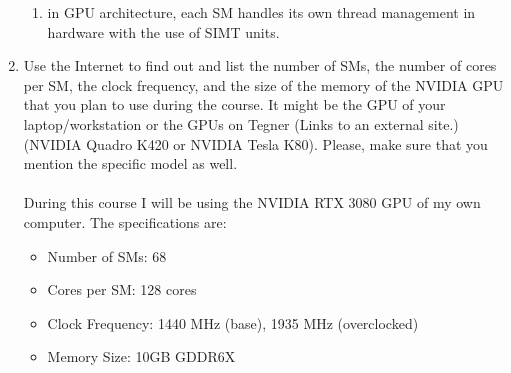 \documentclass[english]{exam}
\begin{document}
\begin{enumerate}
\begin{enumerate}
  \item in GPU architecture, each SM handles its own thread management in hardware with the use of SIMT units.
  \end{enumerate}
\item Use the Internet to find out and list the number of SMs, the number of cores per SM, the clock frequency, and the size of the memory of the NVIDIA GPU that you plan to use during the course. It might be the GPU of your laptop/workstation or the GPUs on Tegner (Links to an external site.) (NVIDIA Quadro K420 or NVIDIA Tesla K80). Please, make sure that you mention the specific model as well.\\\\
  During this course I will be using the NVIDIA RTX 3080 GPU of my own computer. The specifications are:
  \begin{itemize}
  \item Number of SMs: 68
  \item Cores per SM: 128 cores
  \item Clock Frequency: 1440 MHz (base), 1935 MHz (overclocked)
  \item Memory Size: 10GB GDDR6X
  \end{itemize}
  

\end{enumerate}
\end{document}
